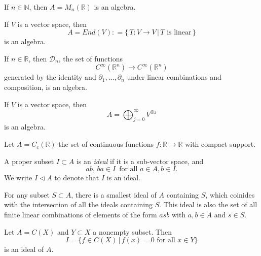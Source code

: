 \documentclass{ximera}
\begin{document}
\begin{example}[Matrices] 
    If $n \in \mathbb{N}$, then $A = M_n (\mathbb{R})$ is an algebra. 
\end{example}

\begin{example}
    If $V$ is a vector space, then
    \[  A =  End(V) : = \{ \, T : V \to V \, \vert \,  T \text{ is linear}\, \}               \]
    is an algebra. 
\end{example}


\begin{example}
    If $n\in \mathbb{R}$, then $\mathcal{D}_n$,  the set of functions 
    \[       C^{\infty}(\mathbb{R}^n) \to C^{\infty} (\mathbb{R}^n)                  \]
    generated by the identity and  $\partial_1, \ldots , \partial_n$ under linear combinations and composition, is an algebra. 
\end{example}

\begin{example}
If $V$ is a vector space, then 
\[  A =  \bigoplus_{j = 0 }^{\infty} V^{\otimes j}    \]
is an algebra.
\end{example}

\begin{example}
    Let $A = C_c (\mathbb{R})$ the set of continuous functions $f : \mathbb{R} \to \mathbb{R}$ with compact support.
\end{example}

\begin{definition}[Ideal]
    A proper subset $I \subset A$ is an \emph{ideal} if it is a sub-vector space, and 
    \[  a b , \, ba \in I  \, \text{ for all } a \in A, b \in I .     \]
    We write $I \triangleleft A$ to denote that $I$ is an ideal.

 For any subset $S \subset A$, there is a smallest ideal of $A$ containing $S$, which coinides with the intersection of all the ideals containing $S$. This ideal is also the set of all finite linear combinations of elements of the form $asb$ with $a,b \in A$ and $s \in S$. 
 
 \end{definition}

\begin{example} Let $A = C(X)$ and $Y \subset X$ a nonempty subset. Then
    \[     I = \{ f \in C(X) \, \vert \, f (x) = 0  \text{ for all } x \in Y  \}       \]
    is an ideal of $A$.
\end{example}
\end{document}
